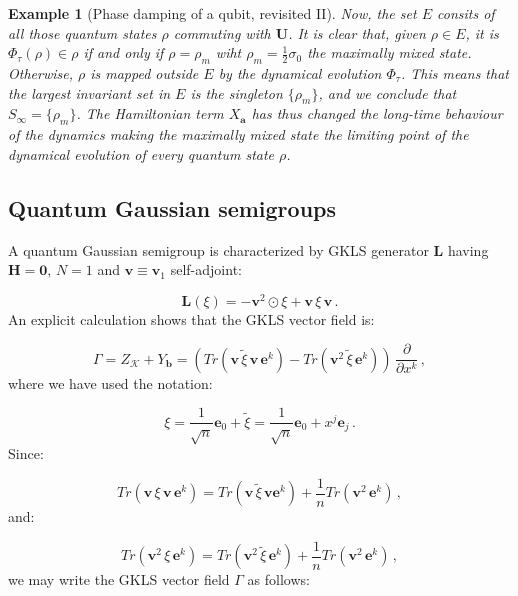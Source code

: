 \documentclass[11pt]{article}
\newcommand{\be}{\begin{equation}}
\newcommand{\ee}{\end{equation}}
\newtheorem{exmp}{Example}
\begin{document}
\begin{exmp}[Phase damping of a qubit, revisited II]
Now, the set $E$ consits of all those quantum states $\rho$ commuting with $\mathbf{U}$.
It is clear that, given $\rho\in E$, it is $\Phi_{\tau}(\rho)\in \rho$ if and only if $\rho=\rho_{m}$ wiht $\rho_{m}=\frac{1}{2}\sigma_{0}$ the maximally mixed state.
Otherwise, $\rho$ is mapped outside $E$ by the dynamical evolution $\Phi_{\tau}$.
This means that the largest invariant set in $E$ is the singleton $\{\rho_{m}\}$, and we conclude that $S_{\infty}=\{\rho_{m}\}$.
The Hamiltonian term $X_{\mathbf{a}}$ has thus changed the long-time behaviour of the dynamics making the maximally mixed state the limiting point of the dynamical evolution of every quantum state $\rho$.
\end{exmp}



\subsection{Quantum Gaussian semigroups}

A quantum Gaussian semigroup \cite{lindblad-on_the_generators_of_quantum_dynamical_semigroups,kossakowski-on_quantum_statistical_mechanics_of_non_hamiltonian_systems,aniello_kossakowski_marmo_ventriglia-quantum_brownian_motion_on_lie_groups_and_open_quantum_systems}
 is characterized by GKLS generator $\mathbf{L}$ having $\mathbf{H}=\mathbf{0}$, $N=1$ and $\mathbf{v}\equiv \mathbf{v}_{1}$ self-adjoint:

\be
\mathbf{L}(\xi)=-\mathbf{v}^{2}\odot\xi + \mathbf{v}\,\xi\,\mathbf{v}\,.
\ee
An explicit calculation shows that the GKLS vector field is:

\be
\Gamma=Z_{\mathcal{K}} + Y_{\mathbf{b}}=\left(Tr\left(\mathbf{v}\,\tilde{\xi}\,\mathbf{v}\,\mathbf{e}^{k}\right) - Tr\left(\mathbf{v}^{2}\,\tilde{\xi}\,\mathbf{e}^{k}\right)\right)\,\frac{\partial}{\partial x^{k}}\,,
\ee
where we have used the notation:

\be
\xi= \frac{1}{\sqrt{n}}\mathbf{e}_{0} + \tilde{\xi}=\frac{1}{\sqrt{n}}\mathbf{e}_{0} + x^{j}\mathbf{e}_{j}\,.
\ee
Since:

\be
Tr\left(\mathbf{v}\,\xi\,\mathbf{v}\,\mathbf{e}^{k}\right)=Tr\left(\mathbf{v}\,\tilde{\xi}\,\mathbf{v}\mathbf{e}^{k}\right)+ \frac{1}{n}Tr\left(\mathbf{v}^{2}\,\mathbf{e}^{k}\right)\,,
\ee
and:

\be
Tr\left(\mathbf{v}^{2}\,\xi\,\mathbf{e}^{k}\right)=Tr\left(\mathbf{v}^{2}\,\tilde{\xi}\,\mathbf{e}^{k}\right)+ \frac{1}{n}Tr\left(\mathbf{v}^{2}\,\mathbf{e}^{k}\right)\,,
\ee
we may write the GKLS vector field $\Gamma$ as follows:
\end{document}
